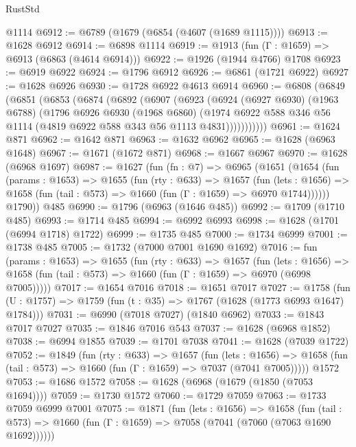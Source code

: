 \begin{lexlean}{RustStd}
\begin{coremodule}
    @1114
@6912 := @6789 (@1679 (@6854 (@4607 (@1689 @1115))))
@6913 := @1628 @6912
@6914 := @6898 @1114
@6919 := @1913 (fun (Γ : @1659) => @6913 (@6863 (@4614 @6914)))
@6922 := @1926 (@1944 @4766) @1708
@6923 := @6919 @6922
@6924 := @1796 @6912
@6926 := @6861 (@1721 @6922)
@6927 := @1628 @6926
@6930 := @1728 @6922 @4613 @6914
@6960 := @6808
    (@6849
      (@6851
        (@6853
          (@6874
            (@6892
              (@6907
                (@6923
                  (@6924
                    (@6927 @6930)
                    (@1963 @6788)
                    (@1796
                      @6926
                      @6930
                      (@1968 @6860)
                      (@1974
                        @6922
                        @588
                        @346
                        @56
                        @1114
                        (@4819 @6922 @588 @343 @56 @1113 @4831)))))))))))
@6961 := @1624 @871
@6962 := @1642 @871
@6963 := @1632 @6962
@6965 := @1628 (@6963 @1648)
@6967 := @1671 (@1672 @871)
@6968 := @1667 @6967
@6970 := @1628 (@6968 @1697)
@6987 := @1627
    (fun (fn : @7) =>
    @6965
      (@1651
        (@1654
          (fun (params : @1653) =>
          @1655
            (fun (rty : @633) =>
            @1657
              (fun (lets : @1656) =>
              @1658 (fun (tail : @573) => @1660 (fun (Γ : @1659) => @6970 @1744))))))
        @1790))
    @485
@6990 := @1796 (@6963 (@1646 @485))
@6992 := @1709 (@1710 @485)
@6993 := @1714 @485
@6994 := @6992 @6993
@6998 := @1628 (@1701 (@6994 @1718) @1722)
@6999 := @1735 @485
@7000 := @1734 @6999
@7001 := @1738 @485
@7005 := @1732 (@7000 @7001 @1690 @1692)
@7016 := fun (params : @1653) =>
  @1655
    (fun (rty : @633) =>
    @1657
      (fun (lets : @1656) =>
      @1658 (fun (tail : @573) => @1660 (fun (Γ : @1659) => @6970 (@6998 @7005)))))
@7017 := @1654 @7016
@7018 := @1651 @7017
@7027 := @1758 (fun (U : @1757) => @1759 (fun (t : @35) => @1767 (@1628 (@1773 @6993 @1647) @1784)))
@7031 := @6990 (@7018 @7027) (@1840 @6962)
@7033 := @1843 @7017 @7027
@7035 := @1846 @7016 @543
@7037 := @1628 (@6968 @1852)
@7038 := @6994 @1855
@7039 := @1701 @7038
@7041 := @1628 (@7039 @1722)
@7052 := @1849
    (fun (rty : @633) =>
    @1657
      (fun (lets : @1656) =>
      @1658 (fun (tail : @573) => @1660 (fun (Γ : @1659) => @7037 (@7041 @7005)))))
    @1572
@7053 := @1686 @1572
@7058 := @1628 (@6968 (@1679 (@1850 (@7053 @1694))))
@7059 := @1730 @1572
@7060 := @1729 @7059
@7063 := @1733 @7059 @6999 @7001
@7075 := @1871
    (fun (lets : @1656) =>
    @1658
      (fun (tail : @573) => @1660 (fun (Γ : @1659) => @7058 (@7041 (@7060 (@7063 @1690 @1692))))))

\end{coremodule}
\end{lexlean}
